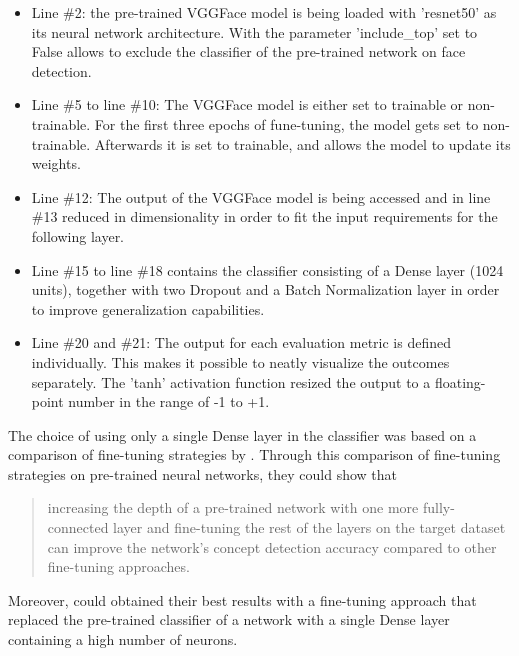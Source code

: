 \begin{itemize}
    \item Line \#2: the pre-trained VGGFace model is being loaded with 'resnet50' as its neural network architecture. With the parameter 'include\_top' set to False allows to exclude the classifier of the pre-trained network on face detection.
    \item Line \#5 to line \#10: The VGGFace model is either set to trainable or non-trainable. For the first three epochs of fune-tuning, the model gets set to non-trainable. Afterwards it is set to trainable, and allows the model to update its weights.
    \item Line \#12: The output of the VGGFace model is being accessed and in line \#13 reduced in dimensionality in order to fit the input requirements for the following layer.
    \item Line \#15 to line \#18 contains the classifier consisting of a Dense layer (1024 units), together with two Dropout and a Batch Normalization layer in order to improve generalization capabilities.
    \item Line \#20 and \#21: The output for each evaluation metric is defined individually. This makes it possible to neatly visualize the outcomes separately. The 'tanh' activation function resized the output to a floating-point number in the range of -1 to +1.
\end{itemize}

The choice of using only a single Dense layer in the classifier was based on a comparison of fine-tuning strategies by \citep{Pittaras:2017:FineTuningStrategiesComparison}. Through this comparison of fine-tuning strategies on pre-trained neural networks, they could show that
\begin{quote}
    increasing the depth of a pre-trained network with one more fully-connected layer and fine-tuning the rest of the layers on the target dataset can improve the network’s concept detection accuracy compared to other fine-tuning approaches. \citep[~p. 103]{Pittaras:2017:FineTuningStrategiesComparison}
\end{quote}

Moreover, \citet{Pittaras:2017:FineTuningStrategiesComparison} could obtained their best results with a fine-tuning approach that replaced the pre-trained classifier of a network with a single Dense layer containing a high number of neurons.



